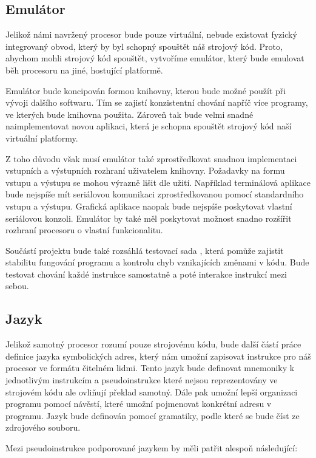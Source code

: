 \subsection{Emulátor}
\label{sec:asm-spec}

Jelikož námi navržený procesor bude pouze virtuální, nebude existovat fyzický integrovaný obvod, který by byl schopný spouštět náš strojový kód. Proto, abychom mohli strojový kód spouštět, vytvoříme emulátor, který bude emulovat běh procesoru na jiné, hostující platformě.

Emulátor bude koncipován formou knihovny, kterou bude možné použít při vývoji dalšího softwaru. Tím se zajistí konzistentní chování napříč více programy, ve kterých bude knihovna použita. Zároveň tak bude velmi snadné naimplementovat novou aplikaci, která je schopna spouštět strojový kód naší virtuální platformy.

Z toho důvodu však musí emulátor také zprostředkovat snadnou implementaci vstupních a výstupních rozhraní uživatelem knihovny. Požadavky na formu vstupu a výstupu se mohou výrazně lišit dle užití. Například terminálová aplikace bude nejspíše mít seriálovou komunikaci zprostředkovanou pomocí standardního vstupu a výstupu. Grafická aplikace naopak bude nejspíše poskytovat vlastní seriálovou konzoli. Emulátor by také měl poskytovat možnost snadno rozšířit rozhraní procesoru o vlastní funkcionalitu.

Součástí projektu bude také rozsáhlá testovací sada , která pomůže zajistit stabilitu fungování programu a kontrolu chyb vznikajících změnami v kódu. Bude testovat chování každé instrukce samostatně a poté interakce instrukcí mezi sebou.

\subsection{Jazyk}

Jelikož samotný procesor rozumí pouze strojovému kódu, bude další částí práce definice jazyka symbolických adres, který nám umožní zapisovat instrukce pro náš procesor ve formátu čitelném lidmi. Tento jazyk bude definovat mnemoniky k jednotlivým instrukcím a pseudoinstrukce které nejsou reprezentovány ve strojovém kódu ale ovliňují překlad samotný. Dále pak umožní lepší organizaci programu pomocí návěstí, které umožní pojmenovat konkrétní adresu v programu. Jazyk bude definován pomocí gramatiky, podle které se bude číst ze zdrojového souboru.

Mezi pseudoinstrukce podporované jazykem by měli patřit alespoň následující:

